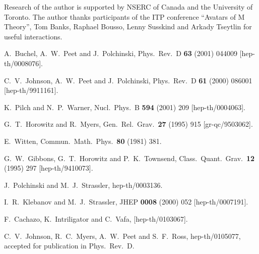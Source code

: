 \documentclass[a4paper,12pt]{amsproc}
\numberwithin{equation}{section}
\def\enh{enhan\c con}
\begin{document}
Research of the author is supported by NSERC of Canada and the
University of Toronto.
%
The author thanks participants of the ITP conference ``Avatars of M
Theory'', 
Tom Banks, Raphael Bousso, Lenny Susskind and Arkady Tseytlin for
useful interactions.


\begin{thebibliography}{99}

 A.~Buchel, A.~W.~Peet and J.~Polchinski, 
Phys.\ Rev.\ D {\bf 63} (2001) 044009 [hep-th/0008076].

 C.~V.~Johnson, A.~W.~Peet and J.~Polchinski,
Phys.\ Rev.\ D {\bf 61} (2000) 086001 [hep-th/9911161].

 K.~Pilch and N.~P.~Warner,
Nucl.\ Phys.\ B {\bf 594} (2001) 209
[hep-th/0004063].

 G.~T.~Horowitz and R.~Myers, 
Gen.\ Rel.\ Grav.\ {\bf 27} (1995) 915 [gr-qc/9503062].

 E.~Witten, 
Commun.\ Math.\ Phys.\ {\bf 80} (1981) 381.

 G.~W.~Gibbons, G.~T.~Horowitz and P.~K.~Townsend,
Class.\ Quant.\ Grav.\ {\bf 12} (1995) 297 [hep-th/9410073].

 J.~Polchinski and M.~J.~Strassler,
hep-th/0003136.

 I.~R.~Klebanov and M.~J.~Strassler,
JHEP {\bf 0008} (2000) 052
[hep-th/0007191].

 F.~Cachazo, K.~Intriligator and C.~Vafa,
[hep-th/0103067].

 C.~V.~Johnson, R.~C.~Myers, A.~W.~Peet and S.~F.~Ross,
hep-th/0105077, accepted for publication in Phys.\ Rev.\ D.


\end{thebibliography}
\end{document}
